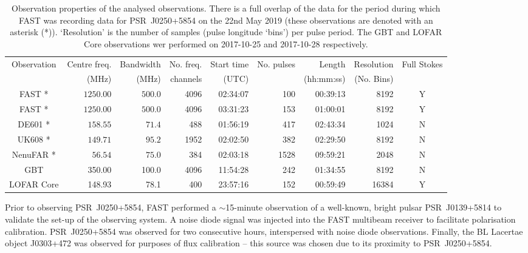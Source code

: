 \begin{landscape} %
\begin{table}
	\centering
	\caption[Simultaneous observations of PSR~J0250+5854]{Observation properties of the analysed observations. There is a full overlap of the data for the period during which FAST was recording data for PSR~J0250+5854 on the 22nd May 2019 (these observations are denoted with an asterisk (*)). `Resolution' is the number of samples (pulse longitude `bins') per pulse period. The GBT and LOFAR Core observations wer performed on 2017-10-25 and 2017-10-28 respectively.}
	\label{tab: J0250 - observations}
	\begin{tabular}{crrrrrrrc} %
		\hline
	    Observation & Centre freq. & Bandwidth & No. freq. & Start time & No. pulses & Length & Resolution & Full Stokes\\
	    & (MHz) & (MHz) & channels & (UTC) & & (hh:mm:ss) & (No. Bins)&\\
		\hline
		FAST *        & $1250.00$ & $500.0$   & 4096 & 02:34:07  & 100   & 00:39:13  & 8192 & Y\\
		FAST *	    & $1250.00$ & $500.0$   & 4096 & 03:31:23 & 153   & 01:00:01  & 8192 & Y\\
		DE601 *        & $158.55$  & $71.4$    & 488  & 01:56:19  & 417   & 02:43:34  & 1024  & N \\
		UK608 *  & $149.71$  & $95.2$    & 1952 & 02:02:50  & 382   & 02:29:50  & 8192  & N\\
		NenuFAR *     & $56.54$   & $75.0$    & 384  & 02:03:18  & 1528  & 09:59:21  & 2048  & N \\
		\hline
		GBT & 350.00 & 100.0 & 4096 & 11:54:28 & 242 & 01:34:55 & 8192 & N\\
		LOFAR Core & 148.93 & 78.1 & 400 & 23:57:16 & 152 & 00:59:49 & 16384 & Y\\
		\hline
	\end{tabular}
\end{table}
\end{landscape}

Prior to observing PSR~J0250+5854, FAST performed a $\sim$15-minute observation of a well-known, bright pulsar PSR~J0139+5814 to validate the set-up of the observing system. A noise diode signal was injected into the FAST multibeam receiver to facilitate polarisation calibration. PSR~J0250+5854 was observed for two consecutive hours, interspersed with noise diode observations. Finally, the BL Lacertae object J0303+472 \citep{VVxx2006} was observed for purposes of flux calibration -- this source was chosen due to its proximity to PSR~J0250+5854.

